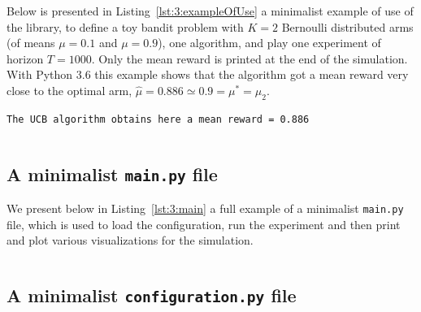 Below is presented in Listing~\ref{lst:3:exampleOfUse} a minimalist example of use of the library, to define a toy bandit problem with $K=2$ Bernoulli distributed arms (of means $\mu=0.1$ and $\mu=0.9$), one \UCB{} algorithm, and play one experiment of horizon $T=1000$.
Only the mean reward is printed at the end of the simulation.
%
With Python 3.6 this example shows that the algorithm got a mean reward very close to the optimal arm, $\hat{\mu} = 0.886 \simeq 0.9 = \mu^* = \mu_2$.
\begin{verbatim}
The UCB algorithm obtains here a mean reward = 0.886
\end{verbatim}
%
\begin{small}
    \inputminted[linenos=true,numbersep=5pt,frame=lines,framesep=2mm]{python3}{2-Chapters/3-Chapter/src/example_of_use_of_SMPyBandits.py}
\end{small}


\subsection{A minimalist \texttt{main.py} file}
\label{sub:3:miniMainFileSMPyBandits}

We present below in Listing~\ref{lst:3:main} a full example of a minimalist \texttt{main.py} file,
which is used to load the configuration, run the experiment and then print and plot various visualizations for the simulation.

\begin{small}
    \inputminted[linenos=true,numbersep=5pt,frame=lines,framesep=2mm]{python3}{2-Chapters/3-Chapter/src/example_of_main_singleplayer.py}
\end{small}


\subsection{A minimalist \texttt{configuration.py} file}
\label{sub:3:miniConfigurationFileSMPyBandits}

